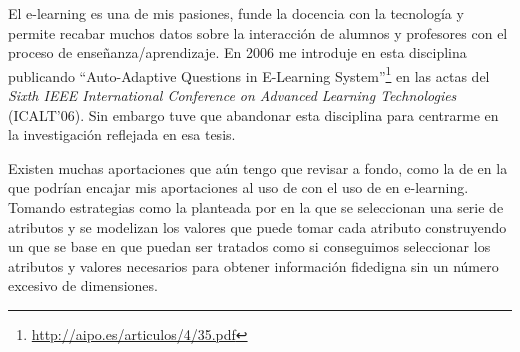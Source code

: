 \ABIERTO
El e-learning es una de mis pasiones, funde la docencia con la tecnología y permite recabar muchos datos sobre la interacción de alumnos y profesores con el proceso de enseñanza/aprendizaje. En 2006 me introduje en esta disciplina publicando "`Auto-Adaptive Questions in E-Learning System"'\footnote{\scriptsize\url{http://aipo.es/articulos/4/35.pdf}} en las actas del \emph{Sixth IEEE International Conference on Advanced Learning Technologies} (ICALT'06). Sin embargo tuve que abandonar esta disciplina para centrarme en la investigación reflejada en esa tesis.

Existen muchas aportaciones que aún tengo que revisar a fondo, como la de \citet{GSalcinesRomeroVenturaDeCastro-CollaborativeRSUsingDistributedRM-2008} en la que podrían encajar mis aportaciones al uso de \catalogos con el uso de \ars en e-learning. Tomando estrategias como la planteada por \citet{CarmonaRGallegoTorresBernalDelJesusGarcia-WUMtoImprovePortalDesign-2012} en la que se seleccionan una serie de atributos y se modelizan los valores que puede tomar cada atributo construyendo un \SRW que se base en \datasets que puedan ser tratados como \catalogos si conseguimos seleccionar los atributos y valores necesarios para obtener información fidedigna sin un número excesivo de dimensiones.